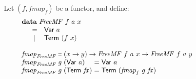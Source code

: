 \documentclass{jfp1}
\newcommand{\kw}[1]{\textbf{#1}}
\begin{document}
\begin{figure}
  Let $(f,\mathit{fmap}_f)$ be a functor, and define:
  \begin{displaymath}
    \begin{array}{l}
      \kw{data}~\mathit{FreeMF}~f~a~x \\
      \quad\begin{array}{cl}
        = & \mathsf{Var}~a \\
        | & \mathsf{Term}~(f~x)
      \end{array} \\
      \\
      \mathit{fmap}_{\mathit{FreeMF}} :: (x \to y) \to \mathit{FreeMF}~f~a~x \to \mathit{FreeMF}~f~a~y \\
      \begin{array}{@{}l@{\hspace{0.3em}}l@{\hspace{0.3em}}l@{\hspace{0.3em}}c@{\hspace{0.3em}}l}
        \mathit{fmap}_{\mathit{FreeMF}} & g & (\mathsf{Var}~a) & = & \mathsf{Var}~a \\
        \mathit{fmap}_{\mathit{FreeMF}} & g & (\mathsf{Term}~\mathit{fx}) & = & \mathsf{Term}~(\mathit{fmap}_f~g~\mathit{fx})
      \end{array}
    \end{array}
  \end{displaymath}

  \bigskip


\end{figure}
\end{document}
